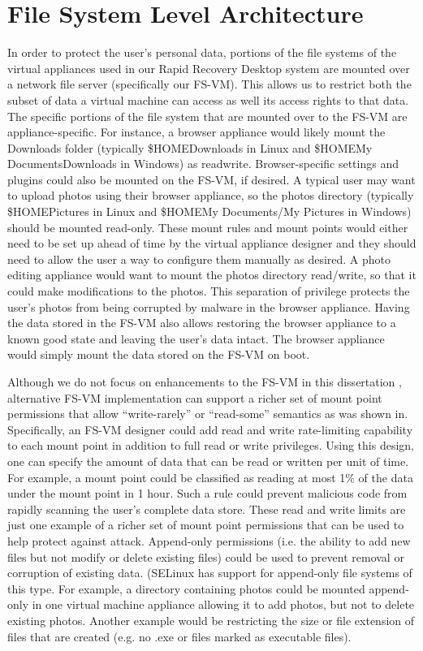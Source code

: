 \section{File System Level Architecture}

In order to protect the user's personal data, portions of the file systems of the virtual appliances used in our Rapid Recovery Desktop system are mounted over a network file server (specifically our FS-VM). This allows us to restrict both the subset of data a virtual machine can access as well its access rights to that data. The specific portions of the file system that are mounted over to the FS-VM are appliance-specific. For instance, a browser appliance would likely mount the Downloads folder (typically \$HOME\/Downloads in Linux and \$HOME\/My Documents\/Downloads in Windows) as read\/write. Browser-specific settings and plugins could also be mounted on the FS-VM, if desired. A typical user may want to upload photos using their browser appliance, so the photos directory (typically \$HOME\/Pictures in Linux and \$HOME\/My Documents/My Pictures in Windows) should be mounted read-only. These mount rules and mount points would either need to be set up ahead of time by the virtual appliance designer and they should need to allow the user a way to configure them manually as desired. A photo editing appliance would want to mount the photos directory read/write, so that it could make modifications to the photos. This separation of privilege protects the user's photos from being corrupted by malware in the browser appliance. Having the data stored in the FS-VM also allows restoring the browser appliance to a known good state and leaving the user's data intact. The browser appliance would simply mount the data stored on the FS-VM on boot.

Although we do not focus on enhancements to the FS-VM in this dissertation , alternative FS-VM implementation can support a richer set of mount point permissions that allow ``write-rarely'' or ``read-some'' semantics as was shown in\cite{rapid_recovery_paper_05}. Specifically, an FS-VM designer could add read and write rate-limiting capability to each mount point in addition to full read or write privileges. Using this design, one can specify the amount of data that can be read or written per unit of time. For example, a mount point could be classified as reading at most 1\% of the data under the mount point in 1 hour. Such a rule could prevent malicious code from rapidly scanning the user’s complete data store. These read and write limits are just one example of a richer set of mount point permissions that can be used to help protect against attack. Append-only permissions (i.e. the ability to add new files but not modify or delete existing files) could be used to prevent removal or corruption of existing data. (SELinux has support for append-only file systems of this type\cite{smalley_2001}. For example, a directory containing photos could be mounted append-only in one virtual machine appliance allowing it to add photos, but not to delete existing photos. Another example would be restricting the size or file extension of files that are created (e.g. no .exe or files marked as executable files).

